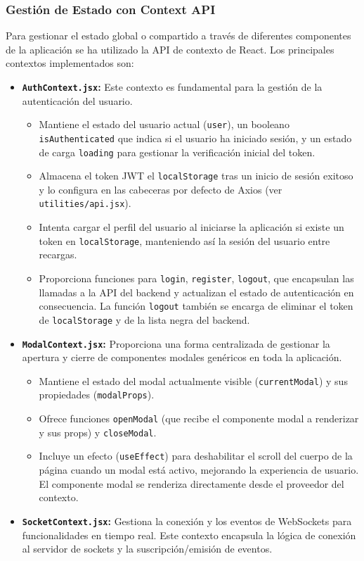 \subsubsection{Gestión de Estado con Context API}
\label{sssec:frontendEstadoContext}

Para gestionar el estado global o compartido a través de diferentes componentes de la aplicación se ha utilizado la API de contexto de React. Los principales contextos implementados son:

\begin{itemize}
    \item \textbf{\texttt{AuthContext.jsx}:} Este contexto es fundamental para la gestión de la autenticación del usuario.
    \begin{itemize}
        \item Mantiene el estado del usuario actual (\texttt{user}), un booleano \texttt{isAuthenticated} que indica si el usuario ha iniciado sesión, y un estado de carga \texttt{loading} para gestionar la verificación inicial del token.
        \item Almacena el token JWT el \texttt{localStorage} tras un inicio de sesión exitoso y lo configura en las cabeceras por defecto de Axios (ver \texttt{utilities/api.jsx}).
        \item Intenta cargar el perfil del usuario al iniciarse la aplicación si existe un token en \texttt{localStorage}, manteniendo así la sesión del usuario entre recargas.
        \item Proporciona funciones para \texttt{login}, \texttt{register}, \texttt{logout}, que encapsulan las llamadas a la API del backend y actualizan el estado de autenticación en consecuencia. La función \texttt{logout} también se encarga de eliminar el token de \texttt{localStorage} y de la lista negra del backend.
    \end{itemize}
    \item \textbf{\texttt{ModalContext.jsx}:} Proporciona una forma centralizada de gestionar la apertura y cierre de componentes modales genéricos en toda la aplicación.
    \begin{itemize}
        \item Mantiene el estado del modal actualmente visible (\texttt{currentModal}) y sus propiedades (\texttt{modalProps}).
        \item Ofrece funciones \texttt{openModal} (que recibe el componente modal a renderizar y sus props) y \texttt{closeModal}.
        \item Incluye un efecto (\texttt{useEffect}) para deshabilitar el scroll del cuerpo de la página cuando un modal está activo, mejorando la experiencia de usuario. El componente modal se renderiza directamente desde el proveedor del contexto.
    \end{itemize}
    \item \textbf{\texttt{SocketContext.jsx}:} Gestiona la conexión y los eventos de WebSockets para funcionalidades en tiempo real. Este contexto encapsula la lógica de conexión al servidor de sockets y la suscripción/emisión de eventos.
\end{itemize}

